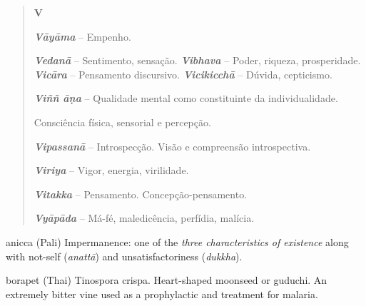\begin{quote}
\textbf{V}

\emph{\textbf{Vāyāma}} -- Empenho.

\emph{\textbf{Vedanā}} -- Sentimento, sensação. \emph{\textbf{Vibhava}} -- Poder, riqueza, prosperidade. \emph{\textbf{Vicāra}} -- Pensamento discursivo. \emph{\textbf{Vicikicchā}} -- Dúvida, cepticismo.

\emph{\textbf{Viññ āṇa}} -- Qualidade mental como constituinte da individualidade.

Consciência física, sensorial e percepção.

\emph{\textbf{Vipassanā}} -- Introspecção. Visão e compreensão introspectiva.

\emph{\textbf{Viriya}} -- Vigor, energia, virilidade.

\emph{\textbf{Vitakka}} -- Pensamento. Concepção-pensamento.

\emph{\textbf{Vyāpāda}} -- Má-fé, maledicência, perfídia, malícia.
\end{quote}



\begin{glossarydescription}


\item[anicca] (Pali) Impermanence: one of the \emph{three characteristics of
    existence} along with not-self (\emph{anattā}) and unsatisfactoriness
  (\emph{dukkha}).


\item[borapet] (Thai) Tinospora crispa. Heart-shaped moonseed or guduchi.
  An extremely bitter vine used as a prophylactic and treatment for malaria.






















\end{glossarydescription}

